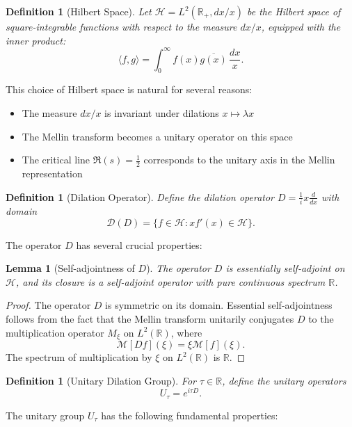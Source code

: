 \documentclass[11pt,hyp,]{nyjm}
\newtheorem{lemma}[theorem]{Lemma}
\newtheorem{definition}[theorem]{Definition}
\begin{document}
\begin{definition}[Hilbert Space]
Let $\mathcal{H} = L^2(\mathbb{R}_+, dx/x)$ be the Hilbert space of square-integrable functions with respect to the measure $dx/x$, equipped with the inner product:
\[
\langle f, g \rangle = \int_0^\infty f(x) \overline{g(x)} \, \frac{dx}{x}.
\]
\end{definition}

This choice of Hilbert space is natural for several reasons:
\begin{itemize}
\item The measure $dx/x$ is invariant under dilations $x \mapsto \lambda x$
\item The Mellin transform becomes a unitary operator on this space
\item The critical line $\Re(s) = \tfrac12$ corresponds to the unitary axis in the Mellin representation
\end{itemize}

\begin{definition}[Dilation Operator]
Define the dilation operator $D = \tfrac{1}{i}x\frac{d}{dx}$ with domain
\[
\mathcal{D}(D) = \{f \in \mathcal{H} : xf'(x) \in \mathcal{H}\}.
\]
\end{definition}

The operator $D$ has several crucial properties:

\begin{lemma}[Self-adjointness of $D$]\label{lem:D-selfadjoint}
The operator $D$ is essentially self-adjoint on $\mathcal{H}$, and its closure is a self-adjoint operator with pure continuous spectrum $\mathbb{R}$.
\end{lemma}

\begin{proof}
The operator $D$ is symmetric on its domain. Essential self-adjointness follows from the fact that the Mellin transform unitarily conjugates $D$ to the multiplication operator $M_\xi$ on $L^2(\mathbb{R})$, where
\[
\mathcal{M}[Df](\xi) = \xi \mathcal{M}[f](\xi).
\]
The spectrum of multiplication by $\xi$ on $L^2(\mathbb{R})$ is $\mathbb{R}$.
\end{proof}

\begin{definition}[Unitary Dilation Group]
For $\tau \in \mathbb{R}$, define the unitary operators
\[
U_\tau = e^{i\tau D}.
\]
\end{definition}

The unitary group $U_\tau$ has the following fundamental properties:
\end{document}
